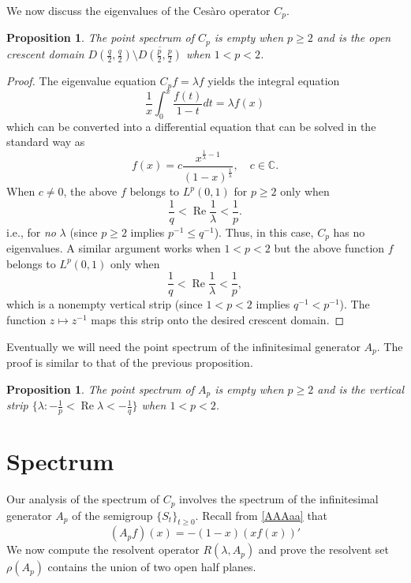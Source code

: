 \documentclass[11pt]{amsart}
\numberwithin{equation}{section}
\theoremstyle{plain}
\newtheorem{Proposition}[equation]{Proposition}
\theoremstyle{definition}
\def\C{\mathbb{C}}
\renewcommand{\leq}{\leqslant}
\renewcommand{\geq}{\geqslant}
\renewcommand{\Re}[1]{\operatorname{Re} #1 }
\newcommand{\0}{{\color{lightgray}0}}
\begin{document}
We now discuss the eigenvalues of  the Ces\`{a}ro operator $C_p$. 

\begin{Proposition} \label{crescenty}
The point spectrum of $C_p$ is empty when  $p \geq  2$ and is the open crescent domain 
$D(\frac{q}{2}, \frac{q}{2}) \setminus \overline{D(\frac{p}{2}, \frac{p}{2})}$ when $1 < p < 2$.
\end{Proposition}
 
 \begin{proof}
The eigenvalue equation $C_p f = \lambda f$  yields the integral equation 
$$\frac{1}{x} \int_{0}^{x} \frac{f(t)}{1 - t} dt = \lambda f(x)$$
which can be converted into a differential equation that can be solved in the standard way as 
$$f(x) = c \frac{x^{\frac{1}{\lambda} - 1}}{(1 - x)^{\frac{1}{\lambda}}}, \quad c \in \C.$$
When $c \not = 0$, the above $f$ belongs to $L^{p}(0, 1)$ for $p \geq 2$ only when 
 $$\frac{1}{q} < \Re \frac{1}{\lambda} < \frac{1}{p}.$$
i.e., for {\em no} $\lambda$ (since $p \geq 2$ implies $p^{-1} \leq q^{-1}$). Thus, in this case, $C_p$  has no eigenvalues. A similar  argument works when $1 < p < 2$ but  the above function  $f$ belongs to $L^p(0, 1)$ only when 
$$\frac{1}{q} < \Re \frac{1}{\lambda} < \frac{1}{p},$$
which is 
a nonempty vertical strip (since $1 < p < 2$ implies $q^{-1} < p^{-1}$). The function $z \mapsto z^{-1}$ maps this strip onto the  desired crescent domain.
\end{proof}


Eventually we will need the point spectrum of the infinitesimal generator  $A_p$. The proof is similar to that of the previous proposition. 

\begin{Proposition}\label{cc8**}
The point spectrum  of $A_p$ is  empty when $p \geq 2$ and is the vertical strip $\{\lambda: -\frac{1}{p} < \Re \lambda < -\frac{1}{q}\}$ when $1 < p < 2$.
\end{Proposition}

\section{Spectrum} 

Our analysis of the spectrum of $C_{p}$ involves the spectrum of the infinitesimal generator $A_p$ of the semigroup $\{S_t\}_{t \geq 0}$.  Recall from \eqref{AAAaa} that
$$(A_p f)(x)=-(1-x)(xf(x))'$$
We now compute the resolvent operator $R(\lambda, A_p)$ and prove the resolvent set $\rho(A_p)$ contains the union of two open half planes.  
 
\end{document}

